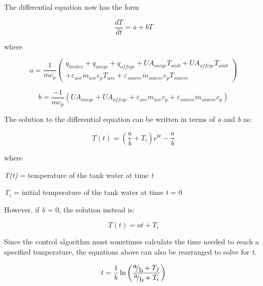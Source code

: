 The differential equation now has the form

\begin{equation}
\frac{{dT}}{{dt}} = a + bT
\end{equation}

where

\begin{equation}
a = \frac{1}{{m{c_p}}}\left( \begin{array}{l}{q_{heater}} + {q_{oncyc}} + {q_{offcyc}} + U{A_{oncyc}}{T_{amb}} + U{A_{offcyc}}{T_{amb}}\\ + {\varepsilon_{use}}{{\dot m}_{use}}{c_p}{T_{use}} + {\varepsilon_{source}}{{\dot m}_{source}}{c_p}{T_{source}}\end{array} \right)
\end{equation}

\begin{equation}
b = \frac{{ - 1}}{{m{c_p}}}\left( {U{A_{oncyc}} + U{A_{offcyc}} + {\varepsilon_{use}}{{\dot m}_{use}}{c_p} + {\varepsilon_{source}}{{\dot m}_{source}}{c_p}} \right)
\end{equation}

The solution to the differential equation can be written in terms of \emph{a} and \emph{b} as:

\begin{equation}
T\left( t \right) = \left( {\frac{a}{b} + {T_i}} \right){e^{bt}} - \frac{a}{b}
\end{equation}

where

\emph{T(t)} = temperature of the tank water at time \emph{t}

\emph{T\(_{i}\)} = initial temperature of the tank water at time \emph{t} = 0

However, if \emph{b} = 0, the solution instead is:

\begin{equation}
T\left( t \right) = at + {T_i}
\end{equation}

Since the control algorithm must sometimes calculate the time needed to reach a specified temperature, the equations above can also be rearranged to solve for \emph{t}.

\begin{equation}
t = \frac{1}{b}\ln \left( {\frac{{{\raise0.7ex\hbox{a} \!\mathord{\left/ {\vphantom {a b}}\right.}\!\lower0.7ex\hbox{b}} + {T_f}}}{{{\raise0.7ex\hbox{a} \!\mathord{\left/ {\vphantom {a b}}\right.}\!\lower0.7ex\hbox{b}} + {T_i}}}} \right)
\end{equation}

